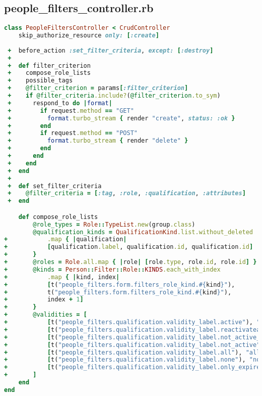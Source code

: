 \newpage

\subsection{people\_filters\_controller.rb}
\begin{lstlisting}[language=Ruby]
class PeopleFiltersController < CrudController
    skip_authorize_resource only: [:create]
  
 +  before_action :set_filter_criteria, except: [:destroy]
 +
 +  def filter_criterion
 +    compose_role_lists
 +    possible_tags
 +    @filter_criterion = params[:filter_criterion]
 +    if @filter_criteria.include?(@filter_criterion.to_sym)
 +      respond_to do |format|
 +        if request.method == "GET"
 +          format.turbo_stream { render "create", status: :ok }
 +        end
 +        if request.method == "POST"
 +          format.turbo_stream { render "delete" }
 +        end
 +      end
 +    end
 +  end
 +
 +  def set_filter_criteria
 +    @filter_criteria = [:tag, :role, :qualification, :attributes]
 +  end

    def compose_role_lists
        @role_types = Role::TypeList.new(group.class)
        @qualification_kinds = QualificationKind.list.without_deleted
+           .map { |qualification|
+           [qualification.label, qualification.id, qualification.id]
+       }
+       @roles = Role.all.map { |role| [role.type, role.id, role.id] }
+       @kinds = Person::Filter::Role::KINDS.each_with_index
+           .map { |kind, index|
+           [t("people_filters.form.filters_role_kind.#{kind}"),
+           t("people_filters.form.filters_role_kind.#{kind}"),
+           index + 1]
+       }
+       @validities = [
+           [t("people_filters.qualification.validity_label.active"), "active", 1],
+           [t("people_filters.qualification.validity_label.reactivateable"), "reactivateable", 2],
+           [t("people_filters.qualification.validity_label.not_active_but_reactivateable"), "not_active_but_reactivateable", 3],
+           [t("people_filters.qualification.validity_label.not_active"), "not_active", 4],
+           [t("people_filters.qualification.validity_label.all"), "all", 5],
+           [t("people_filters.qualification.validity_label.none"), "none", 6],
+           [t("people_filters.qualification.validity_label.only_expired"), "only_expired", 7]
+       ]
    end
end    
\end{lstlisting}

\newpage

